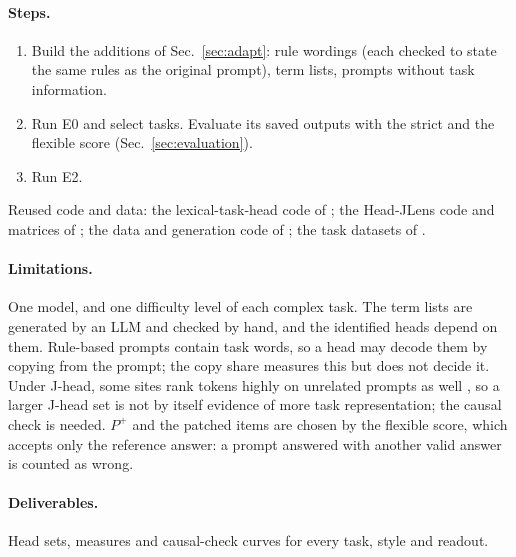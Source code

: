 \documentclass[11pt,a4paper]{article}
\begin{document}
\paragraph{Steps.}
\begin{enumerate}
\item Build the additions of Sec.~\ref{sec:adapt}: rule wordings (each checked to state the same rules as the original prompt), term lists, prompts without task information.
\item Run E0 and select tasks. Evaluate its saved outputs with the strict and the flexible score (Sec.~\ref{sec:evaluation}).
\item Run E2.
\end{enumerate}
Reused code and data: the lexical-task-head code of \citet{yang2026shared}; the Head-JLens code and matrices of \citet{merlo2026headjlens}; the data and generation code of \citet{fu2026rules}; the task datasets of \citet{todd2024function}.

\paragraph{Limitations.} One model, and one difficulty level of each complex task. The term lists are generated by an LLM and checked by hand, and the identified heads depend on them. Rule-based prompts contain task words, so a head may decode them by copying from the prompt; the copy share measures this but does not decide it. Under J-head, some sites rank tokens highly on unrelated prompts as well \citep[Sec.~3.6]{merlo2026headjlens}, so a larger J-head set is not by itself evidence of more task representation; the causal check is needed. $P^{+}$ and the patched items are chosen by the flexible score, which accepts only the reference answer: a prompt answered with another valid answer is counted as wrong.

\paragraph{Deliverables.} Head sets, measures and causal-check curves for every task, style and readout.




\appendix



\clearpage
\end{document}
